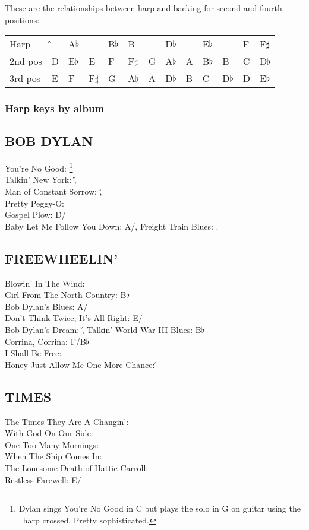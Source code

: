 These are the relationships between harp and backing for second and
fourth positions:

\begin{center}\begin{tabular}{lllllllllllll}
Harp & \G & A$\flat$ & \A & B$\flat$ & B & \C & D$\flat$ & \D & E$\flat$ & \E & F& F$\sharp$\tabularnewline
2nd pos & D & E$\flat$ & E & F & F$\sharp$ & G & A$\flat$ & A & B$\flat$ & B & C & D$\flat$\tabularnewline
3rd pos & E & F & F$\sharp$ & G & A$\flat$ & A & D$\flat$ & B & C & D$\flat$ & D & E$\flat$\tabularnewline
\end{tabular}\end{center}

\subsubsection*{Harp keys by album}

\subsection{BOB DYLAN}
You're No Good: \C\footnote{Dylan sings You're No Good in C but plays the solo in G on guitar using the \C~harp crossed. Pretty sophisticated.} \\
Talkin' New York: \G,\\
Man of Constant Sorrow: \G,\\
Pretty Peggy-O: \G\\ Gospel Plow: D/\G\\ Baby Let Me Follow You Down: A/\D,
Freight Train Blues: \C.


\subsection{FREEWHEELIN'}
Blowin' In The Wind: \D\\
Girl From The North Country: B$\flat$\\
Bob Dylan's Blues: A/\D\\
Don't Think Twice, It's All Right: E/\A\\
Bob Dylan's Dream: \G,
 Talkin' World War III Blues: B$\flat$\\
 Corrina, Corrina: F/B$\flat$\\
 I Shall Be Free: \G\\
 Honey Just Allow Me One More Chance: \G


\subsection{TIMES}
The Times They Are A-Changin': \G\\
With God On Our Side: \C\\
One Too Many Mornings: \C\\
When The Ship Comes In: \G\\
The Lonesome Death of Hattie Carroll: \E\\
Restless Farewell: E/\A


